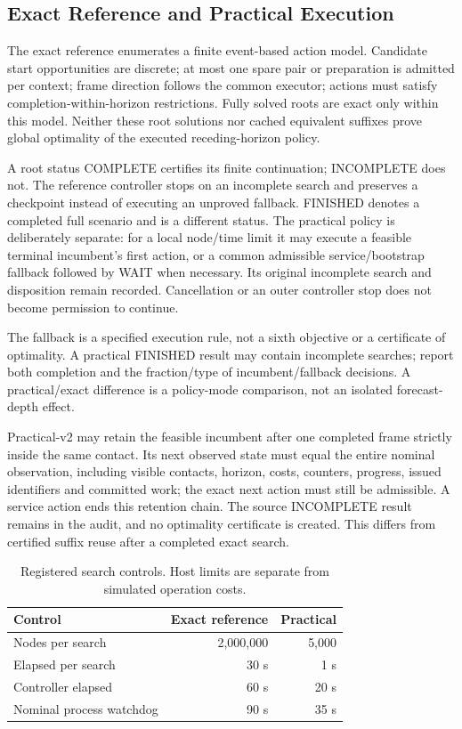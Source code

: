 \documentclass[conference]{IEEEtran}
\begin{document}
\subsection{Exact Reference and Practical Execution}
The exact reference enumerates a finite event-based action model. Candidate start opportunities are discrete; at most one spare pair or preparation is admitted per context; frame direction follows the common executor; actions must satisfy completion-within-horizon restrictions. Fully solved roots are exact only within this model. Neither these root solutions nor cached equivalent suffixes prove global optimality of the executed receding-horizon policy.

A root status COMPLETE certifies its finite continuation; INCOMPLETE does not. The reference controller stops on an incomplete search and preserves a checkpoint instead of executing an unproved fallback. FINISHED denotes a completed full scenario and is a different status. The practical policy is deliberately separate: for a local node/time limit it may execute a feasible terminal incumbent's first action, or a common admissible service/bootstrap fallback followed by WAIT when necessary. Its original incomplete search and disposition remain recorded. Cancellation or an outer controller stop does not become permission to continue.

The fallback is a specified execution rule, not a sixth objective or a certificate of optimality. A practical FINISHED result may contain incomplete searches; report both completion and the fraction/type of incumbent/fallback decisions. A practical/exact difference is a policy-mode comparison, not an isolated forecast-depth effect.

Practical-v2 may retain the feasible incumbent after one completed frame strictly inside the same contact. Its next observed state must equal the entire nominal observation, including visible contacts, horizon, costs, counters, progress, issued identifiers and committed work; the exact next action must still be admissible. A service action ends this retention chain. The source INCOMPLETE result remains in the audit, and no optimality certificate is created. This differs from certified suffix reuse after a completed exact search.

\begin{table}[t]
\centering\small
\caption{Registered search controls. Host limits are separate from simulated operation costs.}
\label{tab:budgets}
\begin{tabular}{lrr}
\toprule
Control & Exact reference & Practical \\
\midrule
Nodes per search & 2,000,000 & 5,000 \\
Elapsed per search & 30 s & 1 s \\
Controller elapsed & 60 s & 20 s \\
Nominal process watchdog & 90 s & 35 s \\
\bottomrule
\end{tabular}
\end{table}
\end{document}
